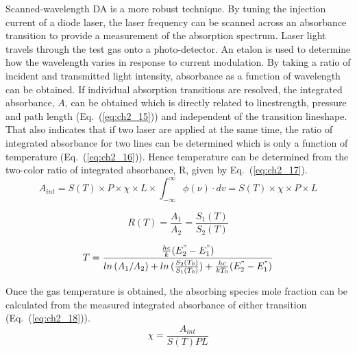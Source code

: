 Scanned-wavelength DA is a more robust technique. By tuning the injection current of a diode laser, the laser frequency can be scanned across an absorbance transition to provide a measurement of the absorption spectrum. Laser light travels through the test gas onto a photo-detector. An etalon is used to determine how the wavelength varies in response to current modulation. By taking a ratio of incident and transmitted light intensity, absorbance as a function of wavelength can be obtained. If individual absorption transitions are resolved, the integrated absorbance, $A$, can be obtained which is directly related to linestrength, pressure and path length (Eq.\ (\ref{eq:ch2_15})) and independent of the transition lineshape. That also indicates that if two laser are applied at the same time, the ratio of integrated absorbance for two lines can be determined which is only a function of temperature (Eq.\ (\ref{eq:ch2_16})). Hence temperature can be determined from the two-color ratio of integrated absorbance, R, given by Eq.\ (\ref{eq:ch2_17}).
\vspace{-2mm}
\begin{equation}\label{eq:ch2_15}
A_{int}=S(T)\times P \times \chi \times L \times \int_{-\infty}^{\infty}\phi(\nu) \cdot dv=S(T) \times \chi \times P \times L
\end{equation}
\vspace{-2mm}

\begin{equation}\label{eq:ch2_16}
R(T)=\frac{A_1}{A_2}=\frac{S_1(T)}{S_2(T)}
\end{equation}

\vspace{-2mm}
\begin{equation}\label{eq:ch2_17}
T=\frac{\frac{hc}{k}(E_2^"-E_1^")}{ln\,(A_1/A_2)+ln\,(\frac{S_2(T_0)}{S_1(T_0)})+\frac{hc}{kT_0}(E_2^"-E_1^")}
\end{equation}

\vspace{5mm}

Once the gas temperature is obtained, the absorbing species mole fraction can be calculated from the measured integrated absorbance of either transition (Eq.\ (\ref{eq:ch2_18})).
\begin{equation}\label{eq:ch2_18}
\chi=\frac{A_{int}}{S(T)PL}
\end{equation}

